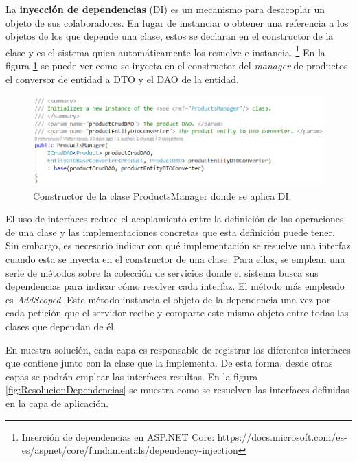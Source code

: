 \documentclass[11pt,spanish,listoffigures]{tfgetsinf}
\begin{document}
La \textbf{inyección de dependencias} (DI) es un mecanismo para desacoplar un objeto de sus colaboradores. En lugar de instanciar o obtener una referencia a los objetos de los que depende una clase, estos se declaran en el constructor de la clase y es el sistema quien automáticamente los resuelve e instancia. \footnote{ Inserción de dependencias en ASP.NET Core: https://docs.microsoft.com/es-es/aspnet/core/fundamentals/dependency-injection} En la figura \ref{fig:ProductsManager} se puede ver como se inyecta en el constructor del \textit{manager} de productos el conversor de entidad a DTO y el DAO de la entidad.

\begin{figure}[h]
\centering
\includegraphics[scale=0.8]{ProductsManager}
\caption{Constructor de la clase ProductsManager donde se aplica DI.}
\label{fig:ProductsManager}
\end{figure}

El uso de interfaces reduce el acoplamiento entre la definición de las operaciones de una clase y las implementaciones concretas que esta definición puede tener. Sin embargo, es necesario indicar con qué implementación se resuelve una interfaz cuando esta se inyecta en el constructor de una clase. Para ellos, se emplean una serie de métodos sobre la colección de servicios donde el sistema busca sus dependencias para indicar cómo resolver cada interfaz. El método más empleado es \textit{AddScoped}. Este método instancia el objeto de la dependencia una vez por cada petición que el servidor recibe y comparte este mismo objeto entre todas las clases que dependan de él.

En nuestra solución, cada capa es responsable de registrar las diferentes interfaces que contiene junto con la clase que la implementa. De esta forma, desde otras capas se podrán emplear las interfaces resultas. En la figura \ref{fig:ResolucionDependencias} se muestra como se resuelven las interfaces definidas en la capa de aplicación.
\end{document}
